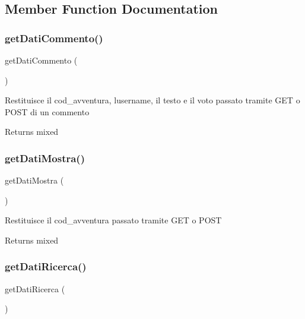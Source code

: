 \subsection{Member Function Documentation}
\mbox{\label{class_v_ricerca_abe042c7ec0bf0e26f8b6d97855ffe723}} 
\subsubsection{\texorpdfstring{get\+Dati\+Commento()}{getDatiCommento()}}
{\footnotesize\ttfamily get\+Dati\+Commento (\begin{DoxyParamCaption}{ }\end{DoxyParamCaption})}

Restituisce il cod\+\_\+avventura, l\textquotesingle{}username, il testo e il voto passato tramite G\+ET o P\+O\+ST di un commento

\begin{DoxyReturn}{Returns}
mixed 
\end{DoxyReturn}
\mbox{\label{class_v_ricerca_a21c1b6e37828f68cadec73d5fe012eef}} 
\subsubsection{\texorpdfstring{get\+Dati\+Mostra()}{getDatiMostra()}}
{\footnotesize\ttfamily get\+Dati\+Mostra (\begin{DoxyParamCaption}{ }\end{DoxyParamCaption})}

Restituisce il cod\+\_\+avventura passato tramite G\+ET o P\+O\+ST

\begin{DoxyReturn}{Returns}
mixed 
\end{DoxyReturn}
\mbox{\label{class_v_ricerca_a0867be22250ee77c1059627deb1333ef}} 
\subsubsection{\texorpdfstring{get\+Dati\+Ricerca()}{getDatiRicerca()}}
{\footnotesize\ttfamily get\+Dati\+Ricerca (\begin{DoxyParamCaption}{ }\end{DoxyParamCaption})}

